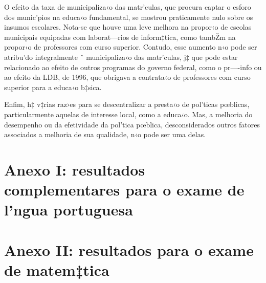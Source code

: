 \documentclass[a4paper, 12pt]{article}
\begin{document}
O efeito da taxa de municipaliza‹o das matr’culas, que procura captar o esforo dos munic’pios na educa‹o fundamental, se mostrou praticamente nulo sobre os insumos escolares. Nota-se que houve uma leve melhora na propor‹o de escolas municipais equipadas com laborat—rios de inform‡tica, como tambŽm na propor‹o de professores com curso superior. Contudo, esse aumento n‹o pode ser atribu’do integralmente ˆ municipaliza‹o das matr’culas, j‡ que pode estar relacionado ao efeito de outros programas do governo federal, como o pr—-info ou ao efeito da LDB, de 1996, que obrigava a contrata‹o de professores com curso superior para a educa‹o b‡sica. 

Enfim, h‡ v‡rias raz›es para se descentralizar a presta‹o de pol’ticas pœblicas, particularmente aquelas de interesse local, como a educa‹o. Mas, a melhoria do desempenho ou da efetividade da pol’tica pœblica, desconsiderados outros fatores associados a melhoria de sua qualidade, n‹o pode ser uma delas. 








\pagebreak





\pagebreak
\appendix
\section{Anexo I: resultados complementares para o exame de l’ngua portuguesa}







\pagebreak
\section{Anexo II: resultados para o exame de matem‡tica}






\end{document}

